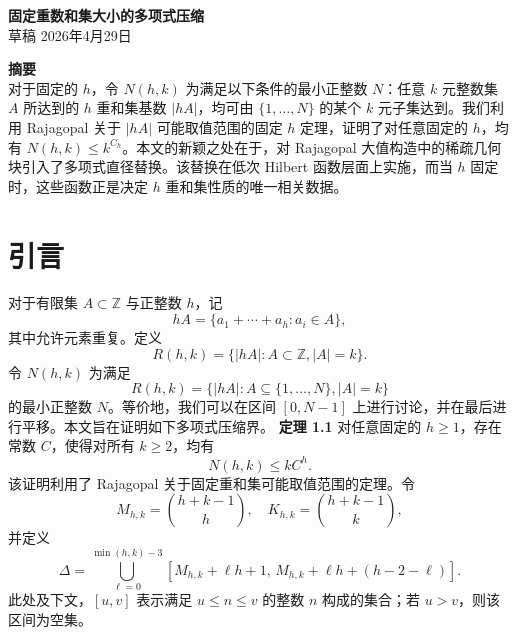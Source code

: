 \documentclass[11pt]{article}
\theoremstyle{break}
\begin{document}
\begin{center}
\textbf{固定重数和集大小的多项式压缩} \\
草稿 \quad 2026年4月29日
\end{center}

\noindent \textbf{摘要} \\
对于固定的 $h$，令 $N(h,k)$ 为满足以下条件的最小正整数 $N$：任意 $k$ 元整数集 $A$ 所达到的 $h$ 重和集基数 $|hA|$，均可由 $\{1,\dots,N\}$ 的某个 $k$ 元子集达到。我们利用 Rajagopal 关于 $|hA|$ 可能取值范围的固定 $h$ 定理，证明了对任意固定的 $h$，均有 $N(h,k) \le k^{C_h}$。本文的新颖之处在于，对 Rajagopal 大值构造中的稀疏几何块引入了多项式直径替换。该替换在低次 Hilbert 函数层面上实施，而当 $h$ 固定时，这些函数正是决定 $h$ 重和集性质的唯一相关数据。
\section{引言}
对于有限集 $A \subset \mathbb{Z}$ 与正整数 $h$，记
\[
hA = \{a_1 + \cdots + a_h : a_i \in A\},
\]
其中允许元素重复。定义
\[
R(h,k) = \{|hA| : A \subset \mathbb{Z}, |A| = k\}.
\]
令 $N(h,k)$ 为满足
\[
R(h,k) = \{|hA| : A \subseteq \{1,\dots,N\}, |A| = k\}
\]
的最小正整数 $N$。等价地，我们可以在区间 $[0, N-1]$ 上进行讨论，并在最后进行平移。本文旨在证明如下多项式压缩界。
\textbf{定理 1.1}
对任意固定的 $h \ge 1$，存在常数 $C$，使得对所有 $k \ge 2$，均有
\[ N(h,k) \le k C^h. \]
该证明利用了 Rajagopal 关于固定重和集可能取值范围的定理。令
\[ M_{h,k} = \binom{h+k-1}{h}, \quad K_{h,k} = \binom{h+k-1}{k}, \]
并定义
\[ \Delta = \bigcup_{\ell=0}^{\min(h,k)-3} \left[ M_{h,k} + \ell h + 1, \, M_{h,k} + \ell h + (h-2-\ell) \right]. \]
此处及下文，$[u,v]$ 表示满足 $u \le n \le v$ 的整数 $n$ 构成的集合；若 $u > v$，则该区间为空集。
\end{document}
